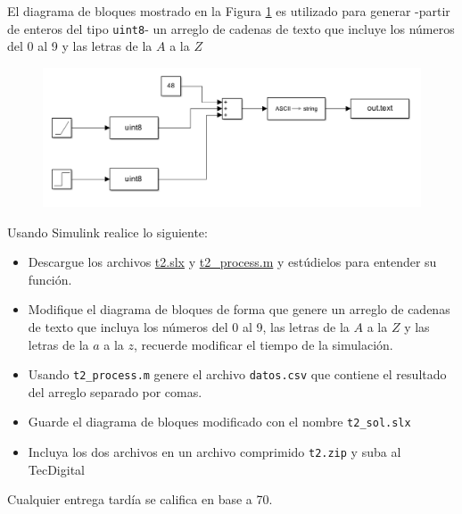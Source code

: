 \documentclass[12pt]{article}
\begin{document}
\setlength{\parindent}{0em}

El diagrama de bloques mostrado en la Figura \ref{fig:for} es utilizado para generar -partir de enteros del tipo \verb+uint8+- un arreglo de cadenas de texto que incluye los números del 0 al 9 y las letras de la $A$ a la $Z$


\begin{figure}[H]
    \centering
    \includegraphics[width=15cm]{fig/t2.1.png}
    \caption{}
    \label{fig:for}
\end{figure}


Usando Simulink realice lo siguiente:

\begin{itemize}
    \item Descargue los archivos \href{https://github.com/juanjorojash/instrumentacion_II/blob/5b8d70f17f7545a45cf6b1aebac0eb5c55f2a2ad/simulaciones/t2.slx}{t2.slx} y \href{https://github.com/juanjorojash/instrumentacion_II/blob/3795263c9e017dead230c0d5c829228d59253f76/simulaciones/t2_process.m}{t2\_process.m} y estúdielos para entender su función.
    \item Modifique el diagrama de bloques de forma que genere un arreglo de cadenas de texto que incluya los números del 0 al 9, las letras de la $A$ a la $Z$ y las letras de la $a$ a la $z$, recuerde modificar el tiempo de la simulación.
    \item Usando \verb+t2_process.m+ genere el archivo \verb+datos.csv+ que contiene el resultado del arreglo separado por comas.
    \item Guarde el diagrama de bloques modificado con el nombre \verb+t2_sol.slx+
    \item Incluya los dos archivos en un archivo comprimido \verb+t2.zip+ y suba al TecDigital
\end{itemize}

Cualquier entrega tardía se califica en base a 70. 


% 
% 
\end{document}
